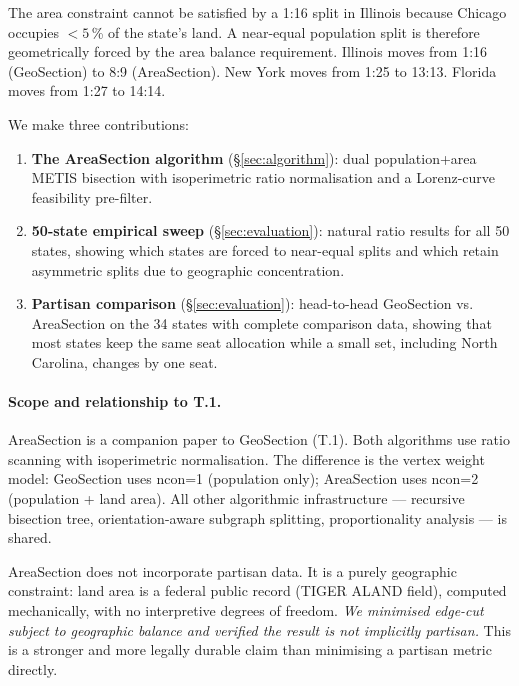The area constraint cannot be satisfied by a 1:16 split in Illinois because
Chicago occupies $<5$\,\% of the state's land.
A near-equal population split is therefore geometrically forced by the area
balance requirement.
Illinois moves from 1:16 (GeoSection) to 8:9 (AreaSection).
New York moves from 1:25 to 13:13.
Florida moves from 1:27 to 14:14.

We make three contributions:

\begin{enumerate}
\item \textbf{The AreaSection algorithm} (\S\ref{sec:algorithm}): dual
  population+area METIS bisection with isoperimetric ratio normalisation and
  a Lorenz-curve feasibility pre-filter.

\item \textbf{50-state empirical sweep} (\S\ref{sec:evaluation}): natural
  ratio results for all 50 states, showing which states are forced to near-equal
  splits and which retain asymmetric splits due to geographic concentration.

\item \textbf{Partisan comparison} (\S\ref{sec:evaluation}): head-to-head
  GeoSection vs. AreaSection on the 34 states with complete comparison data,
  showing that most states keep the same seat allocation while a small set,
  including North Carolina, changes by one seat.
\end{enumerate}

\paragraph{Scope and relationship to T.1.}
AreaSection is a companion paper to GeoSection (T.1).
Both algorithms use ratio scanning with isoperimetric normalisation.
The difference is the vertex weight model: GeoSection uses ncon=1
(population only); AreaSection uses ncon=2 (population + land area).
All other algorithmic infrastructure --- recursive bisection tree,
orientation-aware subgraph splitting, proportionality analysis --- is shared.

AreaSection does not incorporate partisan data.
It is a purely geographic constraint: land area is a federal public record
(TIGER ALAND field), computed mechanically, with no interpretive degrees of
freedom.
\emph{We minimised edge-cut subject to geographic balance and verified the
result is not implicitly partisan.} This is a stronger and more legally durable
claim than minimising a partisan metric directly.
